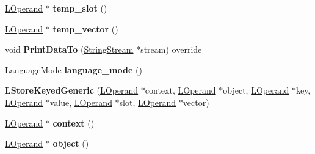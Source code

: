 \begin{DoxyCompactItemize}
\item 
\hyperlink{classv8_1_1internal_1_1_l_operand}{L\+Operand} $\ast$ {\bfseries temp\+\_\+slot} ()\hypertarget{classv8_1_1internal_1_1_l_store_keyed_generic_a2badce4286c0f26664dbddd0e2b29846}{}\label{classv8_1_1internal_1_1_l_store_keyed_generic_a2badce4286c0f26664dbddd0e2b29846}

\item 
\hyperlink{classv8_1_1internal_1_1_l_operand}{L\+Operand} $\ast$ {\bfseries temp\+\_\+vector} ()\hypertarget{classv8_1_1internal_1_1_l_store_keyed_generic_a8e332b61e68443ed2a912b79cbf01438}{}\label{classv8_1_1internal_1_1_l_store_keyed_generic_a8e332b61e68443ed2a912b79cbf01438}

\item 
void {\bfseries Print\+Data\+To} (\hyperlink{classv8_1_1internal_1_1_string_stream}{String\+Stream} $\ast$stream) override\hypertarget{classv8_1_1internal_1_1_l_store_keyed_generic_ab0d8e8441ce3f1b71da8ce0ccf807df8}{}\label{classv8_1_1internal_1_1_l_store_keyed_generic_ab0d8e8441ce3f1b71da8ce0ccf807df8}

\item 
Language\+Mode {\bfseries language\+\_\+mode} ()\hypertarget{classv8_1_1internal_1_1_l_store_keyed_generic_a279b2804fdca1b8181ce7a4b2e7a0d88}{}\label{classv8_1_1internal_1_1_l_store_keyed_generic_a279b2804fdca1b8181ce7a4b2e7a0d88}

\item 
{\bfseries L\+Store\+Keyed\+Generic} (\hyperlink{classv8_1_1internal_1_1_l_operand}{L\+Operand} $\ast$context, \hyperlink{classv8_1_1internal_1_1_l_operand}{L\+Operand} $\ast$object, \hyperlink{classv8_1_1internal_1_1_l_operand}{L\+Operand} $\ast$key, \hyperlink{classv8_1_1internal_1_1_l_operand}{L\+Operand} $\ast$value, \hyperlink{classv8_1_1internal_1_1_l_operand}{L\+Operand} $\ast$slot, \hyperlink{classv8_1_1internal_1_1_l_operand}{L\+Operand} $\ast$vector)\hypertarget{classv8_1_1internal_1_1_l_store_keyed_generic_af091880976ae47ab5668f689b739343e}{}\label{classv8_1_1internal_1_1_l_store_keyed_generic_af091880976ae47ab5668f689b739343e}

\item 
\hyperlink{classv8_1_1internal_1_1_l_operand}{L\+Operand} $\ast$ {\bfseries context} ()\hypertarget{classv8_1_1internal_1_1_l_store_keyed_generic_a4f167d2748fbfa19937cabab260ea080}{}\label{classv8_1_1internal_1_1_l_store_keyed_generic_a4f167d2748fbfa19937cabab260ea080}

\item 
\hyperlink{classv8_1_1internal_1_1_l_operand}{L\+Operand} $\ast$ {\bfseries object} ()\hypertarget{classv8_1_1internal_1_1_l_store_keyed_generic_af1106ab73c930b73c937d138a3b68d6e}{}\label{classv8_1_1internal_1_1_l_store_keyed_generic_af1106ab73c930b73c937d138a3b68d6e}


\end{DoxyCompactItemize}
